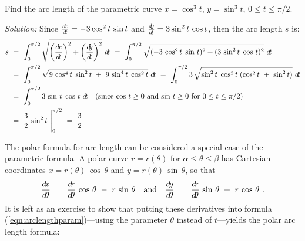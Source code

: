 \begin{exmp}\label{exmp:arclencos3sin3}
\noindent Find the arc length of the parametric curve $x=\cos^3 t$,
$y=\sin^3 t$, $0 \le t \le \pi/2$.\vspace{1mm}
\par\noindent\emph{Solution:} Since $\frac{d\negmedspace x}{d\!t}=-3\cos^2 t\,\sin t$ and
$\frac{d\negmedspace y}{d\!t}=3\sin^2 t\,\cos t$, then the arc length $s$ is:
\begin{align*}
s ~&=~ \int_0^{\pi/2} \sqrt{\left(\dxdt\right)^2 + \left(\dydt\right)^2}~\dt ~=~
       \int_0^{\pi/2} \sqrt{(-3\,\cos^2 t\;\sin\,t)^2 + (3\,\sin^2 t\;\cos\,t)^2}~\dt\\
&=~ \int_0^{\pi/2} \sqrt{9\,\cos^4 t\;\sin^2 t ~+~ 9\,\sin^4 t\;\cos^2 t}~\dt ~=~
    \int_0^{\pi/2} 3\,\sqrt{\sin^2 t\;\cos^2 t\;(\cos^2 t ~+~ \sin^2 t)}~\dt\\
&=~ \int_0^{\pi/2} 3\,\sin\,t\;\cos\,t~\dt
\quad\text{(since $\cos\,t \ge 0$ and $\sin\,t \ge 0$ for $0 \le t \le \pi/2$)}\\
&=~ \frac{3}{2}\,\sin^2 t~\Biggr|_0^{\pi/2} ~=~ \frac{3}{2}
\end{align*}
\end{exmp}
\divider
\vspace{2mm}

The polar formula for arc length can be considered a special case of the
parametric formula. A polar curve $r=r(\theta)$ for $\alpha\le\theta\le\beta$
has Cartesian coordinates $x=r(\theta)\,\cos\,\theta$ and
$y=r(\theta)\,\sin\,\theta$, so that
\[
\frac{\dx}{\dtheta} ~=~ \frac{\dr}{\dtheta}\,\cos\,\theta ~-~ r\,\sin\,\theta
\quad\text{and}\quad
\frac{\dy}{\dtheta} ~=~ \frac{\dr}{\dtheta}\,\sin\,\theta ~+~ r\,\cos\,\theta ~.
\]
It is left as an exercise to show that putting these derivatives into formula
(\ref{eqn:arclengthparam})---using the parameter $\theta$ instead of
$t$---yields the polar arc length formula:

